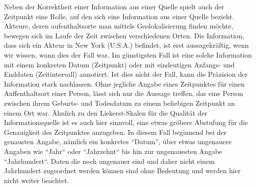 Neben der Korrektheit einer Information aus einer Quelle spielt auch der Zeitpunkt eine Rolle, auf den sich eine Information aus einer Quelle bezieht. Akteure, deren aufenthaltsorte man mittels Geolokalisierung finden möchte, bewegen sich im Laufe der Zeit zwischen verschiedenen Orten. Die Information, dass sich ein Akteur in New York (U.S.A.) befindet, ist erst aussagekräftig, wenn wir wissen, wann dies der Fall war. Im günstigsten Fall ist eine solche Information mit einem konkreten Datum (Zeitpunkt) oder mit eindeutigen Anfangs- und Enddaten (Zeitintervall) annotiert. Ist dies nicht der Fall, kann die Präzision der Information stark nachlassen. Ohne jegliche Angabe eines Zeitpunktes für einen Auffenthaltsort einer Person, lässt sich nur die Aussage treffen, das eine Person zwischen ihrem Geburts- und Todesdatum zu einem beliebigen Zeitpunkt an einem Ort war. Ähnlich zu den Liekerst-Skalen für die Qualität der Informationsquelle ist es auch hier sinnvoll, eine etwas gröbere Abstufung für die Genauigkeit des Zeitpunktes anzugeben. In diesem Fall beginnend bei der genausten Angabe, nämlich ein konkretes ``Datum'', über etwas ungenauere Angaben wie ``Jahr`` oder ``Jahrzehnt`` bis hin zur ungenauesten Angabe ``Jahrhundert``. Daten die noch ungenauer sind und daher nicht einem Jahrhundert zugeordnet werden können sind ohne Bedeutung und werden hier nicht weiter beachtet.

